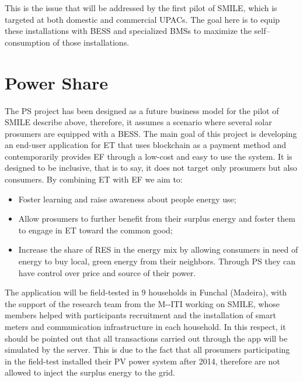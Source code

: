 This is the issue that will be addressed by the first pilot of \ac{SMILE}, which is targeted at both domestic and commercial \acp{UPAC}. The goal here is to equip these installations with BESS and specialized \acp{BMS} to maximize the self--consumption of those installations.


\section{Power Share}
The \ac{PS} project has been designed as a future business model for the pilot of \ac{SMILE} describe above, therefore, it assumes a scenario where several solar prosumers are equipped with a \ac{BESS}.
The main goal of this project is developing an end-user application for \ac{ET} that uses blockchain as a payment method and contemporarily provides \ac{EF} through a low-cost and easy to use the system. It is designed to be inclusive, that is to say, it does not target only prosumers but also consumers. By combining \ac{ET} with \ac{EF} we aim to:

\begin{itemize}
\item Foster learning and raise awareness about people energy use;
\item Allow prosumers to further benefit from their surplus energy and foster them to engage in \ac{ET} toward the common good;
\item Increase the share of RES in the energy mix by allowing consumers in need of energy to buy local, green energy from their neighbors. Through \ac{PS} they can have control over price and source of their power.
\end{itemize}


The application will be field-tested in 9 households in Funchal (Madeira), with the support of the research team from the \ac{M--ITI} working on SMILE, whose members helped with participants recruitment and the installation of smart meters and communication infrastructure in each household.
In this respect, it should be pointed out that all transactions carried out through the app will be simulated by the server. This is due to the fact that all prosumers participating in the field-test installed their \ac{PV} power system after 2014, therefore are not allowed to inject the surplus energy to the grid.



